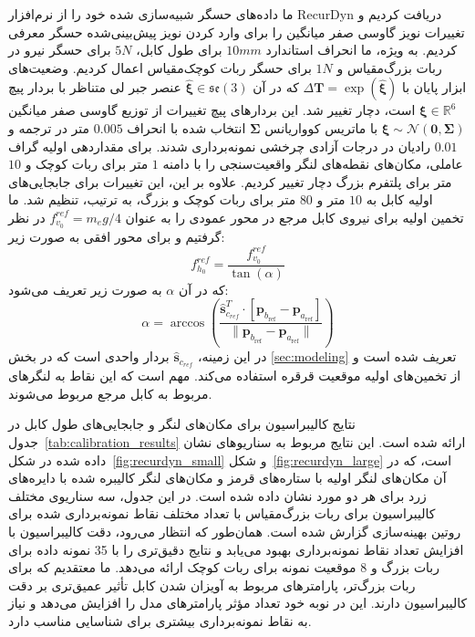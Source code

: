 ما داده‌های حسگر شبیه‌سازی شده خود را از نرم‌افزار RecurDyn دریافت کردیم و تغییرات نویز گاوسی صفر میانگین را برای وارد کردن نویز پیش‌بینی‌شده حسگر معرفی کردیم. به ویژه، ما انحراف استاندارد $10mm$ برای طول کابل، $5N$ برای حسگر نیرو در ربات بزرگ‌مقیاس و $1N$ برای حسگر ربات کوچک‌مقیاس اعمال کردیم. وضعیت‌های ابزار پایان با $\Delta \mathbf{T} = \exp(\hat{\boldsymbol{\xi}})$ که در آن $\hat{\boldsymbol{\xi}} \in \mathfrak{se}(3)$ عنصر جبر لی متناظر با بردار پیچ $\boldsymbol{\xi} \in \mathbb{R}^6$ است، دچار تغییر شد. این بردارهای پیچ تغییرات از توزیع گاوسی صفر میانگین $\boldsymbol{\xi}\sim\mathcal{N}(\mathbf{0}, \boldsymbol{\Sigma})$ با ماتریس کوواریانس $\boldsymbol{\Sigma}$ انتخاب شده با انحراف $0.005$ متر در ترجمه و $0.01$ رادیان در درجات آزادی چرخشی نمونه‌برداری شدند.
برای مقداردهی اولیه گراف عاملی، مکان‌های نقطه‌های لنگر واقعیت‌سنجی را با دامنه $1$ متر برای ربات کوچک و $10$ متر برای پلتفرم بزرگ دچار تغییر کردیم. علاوه بر این، این تغییرات برای جابجایی‌های اولیه کابل به $10$ متر و $80$ متر برای ربات کوچک و بزرگ، به ترتیب، تنظیم شد. ما تخمین اولیه برای نیروی کابل مرجع در محور عمودی را به عنوان $f^{{ref}}_{v_0}=m_eg/4$ در نظر گرفتیم و برای محور افقی به صورت زیر:
\begin{equation}  \label{eq:fh_0}
	f^{ref}_{h_0}=\frac{f^{{ref}}_{v_0}}{\tan(\alpha)} 
\end{equation}
که در آن $\alpha$ به صورت زیر تعریف می‌شود:
\begin{equation}  \label{eq:alpha}
	\alpha = \arccos\left(\frac{\hat{\bm{s}}_{c_{ref}}^T \cdot [\bm{p}_{b_{\text{ref}}} - \bm{p}_{a_{\text{ref}}}]}{\| \bm{p}_{b_{\text{ref}}} - \bm{p}_{a_{\text{ref}}} \|}\right)
\end{equation}
در این زمینه، $\hat{\bm{s}}_{c_{ref}}$ بردار واحدی است که در بخش \ref{sec:modeling} تعریف شده است و از تخمین‌های اولیه موقعیت قرقره استفاده می‌کند. مهم است که این نقاط به لنگرهای مربوط به کابل مرجع مربوط می‌شوند.

نتایج کالیبراسیون برای مکان‌های لنگر و جابجایی‌های طول کابل در جدول~\ref{tab:calibration_results} ارائه شده است. این نتایج مربوط به سناریوهای نشان داده شده در شکل~\ref{fig:recurdyn_small} و شکل~\ref{fig:recurdyn_large} است، که در آن مکان‌های لنگر اولیه با ستاره‌های قرمز و مکان‌های لنگر کالیبره شده با دایره‌های زرد برای هر دو مورد نشان داده شده است.
در این جدول، سه سناریوی مختلف کالیبراسیون برای ربات بزرگ‌مقیاس با تعداد مختلف نقاط نمونه‌برداری شده برای روتین بهینه‌سازی گزارش شده است. همان‌طور که انتظار می‌رود، دقت کالیبراسیون با افزایش تعداد نقاط نمونه‌برداری بهبود می‌یابد و نتایج دقیق‌تری را با 35 نمونه داده برای ربات بزرگ و 8 موقعیت نمونه برای ربات کوچک ارائه می‌دهد. ما معتقدیم که برای ربات بزرگ‌تر، پارامترهای مربوط به آویزان شدن کابل تأثیر عمیق‌تری بر دقت کالیبراسیون دارند. این در نوبه خود تعداد مؤثر پارامترهای مدل را افزایش می‌دهد و نیاز به نقاط نمونه‌برداری بیشتری برای شناسایی مناسب دارد.

